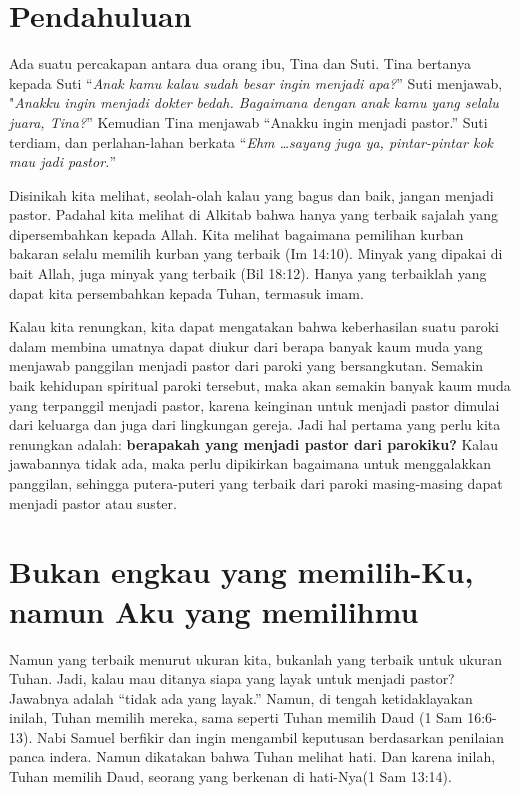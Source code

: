 
\section*{Pendahuluan}

Ada suatu percakapan antara dua orang ibu, Tina dan Suti. Tina bertanya kepada Suti “\textit{Anak kamu kalau sudah besar ingin menjadi apa?}” Suti menjawab, "\textit{Anakku ingin menjadi dokter bedah. Bagaimana dengan anak kamu yang selalu juara, Tina?}” Kemudian Tina menjawab “Anakku ingin menjadi pastor.” Suti terdiam, dan perlahan-lahan berkata “\textit{Ehm \ldots sayang juga ya, pintar-pintar kok mau jadi pastor.}”

Disinikah kita melihat, seolah-olah kalau yang bagus dan baik, jangan menjadi pastor. Padahal kita melihat di Alkitab bahwa hanya yang terbaik sajalah yang dipersembahkan kepada Allah. Kita melihat bagaimana pemilihan kurban bakaran selalu memilih kurban yang terbaik (Im 14:10). Minyak yang dipakai di bait Allah, juga minyak yang terbaik (Bil 18:12). Hanya yang terbaiklah yang dapat kita persembahkan kepada Tuhan, termasuk imam.

Kalau kita renungkan, kita dapat mengatakan bahwa keberhasilan suatu paroki dalam membina umatnya dapat diukur dari berapa banyak kaum muda yang menjawab panggilan menjadi pastor dari paroki yang bersangkutan. Semakin baik kehidupan spiritual paroki tersebut, maka akan semakin banyak kaum muda yang terpanggil menjadi pastor, karena keinginan untuk menjadi pastor dimulai dari keluarga dan juga dari lingkungan gereja. Jadi hal pertama yang perlu kita renungkan adalah: \textbf{berapakah yang menjadi pastor dari parokiku?} Kalau jawabannya tidak ada, maka perlu dipikirkan bagaimana untuk menggalakkan panggilan, sehingga putera-puteri yang terbaik dari paroki masing-masing dapat menjadi pastor atau suster.

\section*{Bukan engkau yang memilih-Ku, namun Aku yang memilihmu}

Namun yang terbaik menurut ukuran kita, bukanlah yang terbaik untuk ukuran Tuhan. Jadi, kalau mau ditanya siapa yang layak untuk menjadi pastor? Jawabnya adalah “tidak ada yang layak.” Namun, di tengah ketidaklayakan inilah, Tuhan memilih mereka, sama seperti Tuhan memilih Daud (1 Sam 16:6-13). Nabi Samuel berfikir dan ingin mengambil keputusan berdasarkan penilaian panca indera. Namun dikatakan bahwa Tuhan melihat hati. Dan karena inilah, Tuhan memilih Daud, seorang yang berkenan di hati-Nya(1 Sam 13:14).

